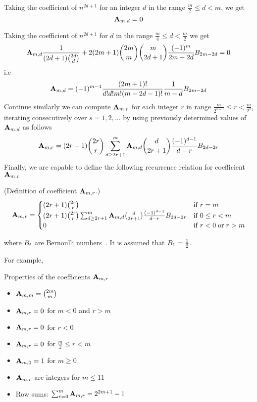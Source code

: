 Taking the coefficient of $n^{2d+1}$ for an integer $d$ in the range $\frac{m}{2} \leq d < m$, we get
\begin{equation*}
    {\mathbf{A}} \sb{m,d} = 0
\end{equation*}

Taking the coefficient of $n^{2d+1}$ for $d$ in the range $\frac{m}{4} \leq d < \frac{m}{2}$ we get
\begin{equation*}
    {\mathbf{A}} \sb{m,d} \frac{1}{(2d+1) \binom{2d}{d}}
    +2 (2m+1) \binom{2m}{m}\binom{m}{2d+1} \frac{(-1)^m}{2m-2d} {B}\sb{2m-2d} = 0
\end{equation*}
i.e
\begin{equation*}
    {\mathbf{A}} \sb{m,d} = (-1)^{m-1} \frac{(2m+1)!}{d!d!m!(m-2d-1)!} \frac{1}{m-d} {B}\sb{2m-2d}
\end{equation*}
Continue similarly we can compute ${\mathbf{A}} \sb{m,r}$ for each integer $r$ in range $\frac{m}{2^{s+1}} \leq r < \frac{m}{2^{s}}$,
iterating consecutively over $s=1,2,\ldots$ by using previously determined values of ${\mathbf{A}} \sb{m,d}$ as follows
\begin{equation*}
    {\mathbf{A}} \sb{m,r} =
    (2r+1) \binom{2r}{r} \sum_{d \geq 2r+1}^{m} {\mathbf{A}} \sb{m,d} \binom{d}{2r+1} \frac{(-1)^{d-1}}{d-r}
    {B}\sb{2d-2r}
\end{equation*}
Finally, we are capable to define the following recurrence relation for coefficient ${\mathbf{A}} \sb{m,r}$
\begin{definition} (Definition of coefficient ${\mathbf{A}} \sb{m,r}$.)
    \begin{equation}
        \label{eq:definition_coefficient_a}
        {\mathbf{A}} \sb{m,r} =
        \begin{cases}
        (2r+1)
            \binom{2r}{r} & \mathrm{if} \; r=m \\
            (2r+1) \binom{2r}{r} \sum_{d \geq 2r+1}^{m} {\mathbf{A}} \sb{m,d} \binom{d}{2r+1} \frac{(-1)^{d-1}}{d-r}
            {B}\sb{2d-2r} & \mathrm{if} \; 0 \leq r<m \\
            0 & \mathrm{if} \; r<0 \; \mathrm{or} \; r>m
        \end{cases}
    \end{equation}
\end{definition}
where ${B}\sb{t}$ are Bernoulli numbers~\cite{bateman1953higher}.
It is assumed that ${B}\sb{1}=\frac{1}{2}$.

For example,


Properties of the coefficients ${\mathbf{A}} \sb{m,r}$
\begin{itemize}
    \item ${\mathbf{A}} \sb{m,m} = \binom{2m}{m}$
    \item ${\mathbf{A}} \sb{m,r} = 0$ for $m < 0$ and $r > m$
    \item ${\mathbf{A}} \sb{m,r} = 0$ for $r < 0$
    \item ${\mathbf{A}} \sb{m,r} = 0$ for $\frac{m}{2} \leq r < m$
    \item ${\mathbf{A}} \sb{m,0} = 1$ for $m \geq 0$
    \item ${\mathbf{A}} \sb{m,r}$ are integers for $m \leq 11$
    \item Row sums: $\sum_{r=0}^{m} {\mathbf{A}} \sb{m,r} = 2^{2m+1} - 1$
\end{itemize}
